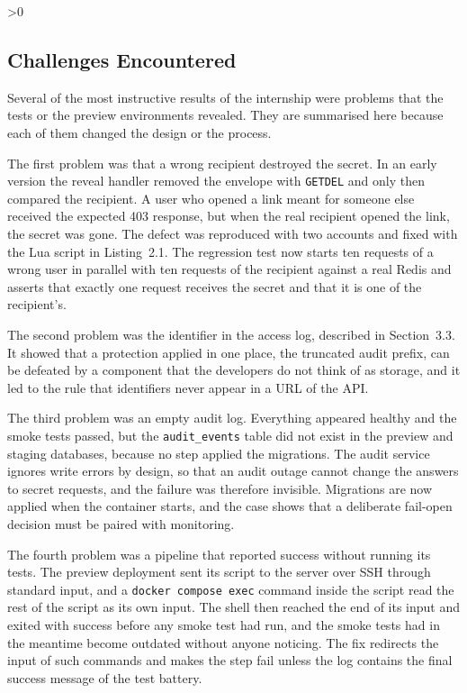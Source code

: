 \documentclass[12pt,a4paper]{article}
\numberwithin{equation}{section}
\numberwithin{figure}{section}
\numberwithin{table}{section}
\newcommand{\subsec}[1]{%
  \ifnum\value{subsection}>0\clearpage\fi
  \subsection{#1}%
}
\begin{document}
\subsec{Challenges Encountered}

Several of the most instructive results of the internship were problems that the tests or the preview environments revealed. They are summarised here because each of them changed the design or the process.

The first problem was that a wrong recipient destroyed the secret. In an early version the reveal handler removed the envelope with \texttt{GETDEL} and only then compared the recipient. A user who opened a link meant for someone else received the expected 403 response, but when the real recipient opened the link, the secret was gone. The defect was reproduced with two accounts and fixed with the Lua script in Listing~2.1. The regression test now starts ten requests of a wrong user in parallel with ten requests of the recipient against a real Redis and asserts that exactly one request receives the secret and that it is one of the recipient's.

The second problem was the identifier in the access log, described in Section~3.3. It showed that a protection applied in one place, the truncated audit prefix, can be defeated by a component that the developers do not think of as storage, and it led to the rule that identifiers never appear in a URL of the API.

The third problem was an empty audit log. Everything appeared healthy and the smoke tests passed, but the \texttt{audit\_events} table did not exist in the preview and staging databases, because no step applied the migrations. The audit service ignores write errors by design, so that an audit outage cannot change the answers to secret requests, and the failure was therefore invisible. Migrations are now applied when the container starts, and the case shows that a deliberate fail-open decision must be paired with monitoring.

The fourth problem was a pipeline that reported success without running its tests. The preview deployment sent its script to the server over SSH through standard input, and a \texttt{docker compose exec} command inside the script read the rest of the script as its own input. The shell then reached the end of its input and exited with success before any smoke test had run, and the smoke tests had in the meantime become outdated without anyone noticing. The fix redirects the input of such commands and makes the step fail unless the log contains the final success message of the test battery.
\end{document}
